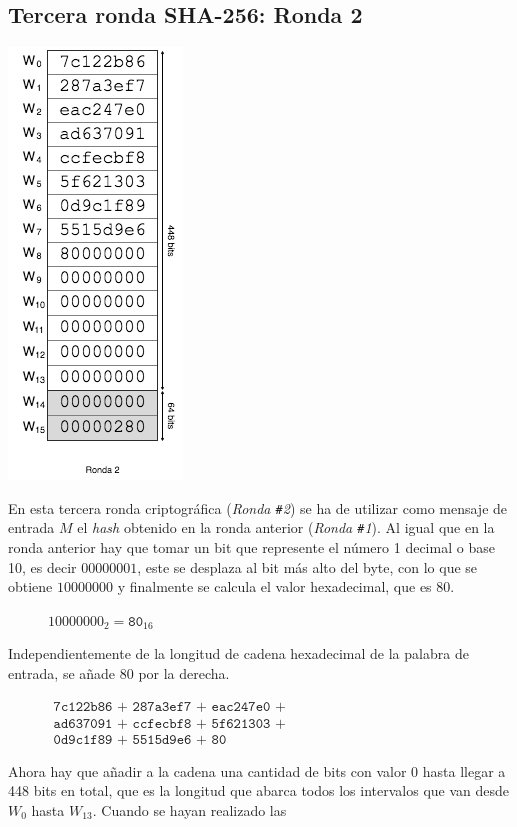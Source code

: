 \documentclass{article}
\begin{document}
        \subsection{Tercera ronda SHA-256: Ronda 2}
        \noindent\begin{minipage}{0.23\textwidth}
        \includegraphics[scale=0.59]{img/Bitcoin_block_SHA_256_W0_W15_ronda_2}
        \end{minipage}
        \hfill
        \begin{minipage}{0.67\textwidth}
        En esta tercera ronda criptográfica (\textit{Ronda \texttt{\#}2}) se ha de utilizar como mensaje de entrada $M$ el \textit{hash} obtenido en la ronda anterior (\textit{Ronda \texttt{\#}1}). Al igual que en la ronda anterior hay que tomar un bit que represente el número 1 decimal o base 10, es decir $00000001$, este se desplaza al bit más alto del byte, con lo que se obtiene $10000000$ y finalmente se calcula el valor hexadecimal, que es $80$.
            \begin{figure}[H]
            \centering
                $10000000_{2} = \texttt{80}_{16}$
            \end{figure}
        Independientemente de la longitud de cadena hexadecimal de la palabra de entrada, se añade $80$ por la derecha.
        \begin{figure}[H]
        \centering
            $\begin{array}{l}
                \texttt{7c122b86 + 287a3ef7 + eac247e0 +} \\
                \texttt{ad637091 + ccfecbf8 + 5f621303 +} \\
                \texttt{0d9c1f89 + 5515d9e6 + 80 }
            \end{array}$
        \end{figure}
        Ahora hay que añadir a la cadena una cantidad de bits con valor $0$ hasta llegar a 448 bits en total, que es la longitud que abarca todos los intervalos que van desde $W_{0}$ hasta $W_{13}$. Cuando se hayan realizado las
        \end{minipage}
        
\end{document}
